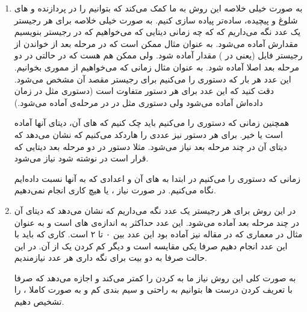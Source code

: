 \begin{enumerate}
    \item به صورت خیلی خلاصه این روش به ما
    کمک می‌کند که بتوانیم
    را در پردازنده و
    های
    شلوغ و پیچیده، ساده‌تر پیاده سازی کنیم.
    به صورت خیلی خلاصه برای هر رجیستر یک عدد نگه می‌داریم که که چه زمانی دیتایی که می‌خواهیم که در رجیستر بنویسیم مقدارش آماده می‌شود. به عنوان مثال ممکن است که در مرحله بعد از خواندن از رجیستر فایل (یعنی در
    )
    مقدار آماده شود. ولی ممکن هم هست که در حالتی در دو مرحله بعد اصلا آماده شود. به
    عنوان مثال زمانی که می‌خواهیم از مموری بخوانیم.
    این عدد هر بار که دستوری را 
    می‌کنیم برای رجیستر مقصد آن مشخص می‌شود.
    دقت کنید که این عدد برای هر دستور متفاوت است (دستوری مثل
    در زمان
    داده‌اش آماده می‌شود ولی دستوری مثل
    در
    در مرحله‌ی
    آماده می‌شود.)
    
    همچنین زمانی که دستوری را
    می‌کنیم باید چک کنیم که
    های
    آن، دیتای آنها آماده است یا خیر. برای هر دستور نیز عددی را هاردکد می‌کنیم که نشان می‌دهد که دیتای آن در چند مرحله بعد نیاز می‌شود. مثلا دستور
    در دو مرحله بعد دیتایی که قرار است در
    نوشته شود نیاز می‌شود.
    
    زمانی که دستوری را
    می‌کنیم در ابتدا به
    های
    آن و اعدادی که به آنها نسبت داده‌ایم نگاه می‌کنیم. در صورت نیاز
    ،  یا هیچ کاری
    انجام نمی‌دهیم.
    \item در این روش برای هر رجیستر یک عدد نگه می‌داریم که نشان می‌دهد که دیتای
    آن در چند مرحله بعد آماده می‌شود. این عدد حداکثر به اندازه‌ی
    های
    است و به عنوان مثال در معماری
    که در مقاله نیز آماده بود این عدد بین ۰ تا ۲ است.
    کاری که باید با این عدد انجام دهیم صرفا یکی مقایسه است و دیگر کم کردن یک از آن. در این حالت صرفا به دو بیت برای نگه داری هر عدد نیازمندیم.
    
    به صورت کلی این روش نیاز ما به
    کردن را کمتر می‌کند و اجازه می‌دهد که صرفا با تعریف کردن درست
    ها
    بتوانیم به راحتی و سیم بندی کم و به صورت کاملا
    ،
    را تشخیص دهیم.
    

\end{enumerate}
